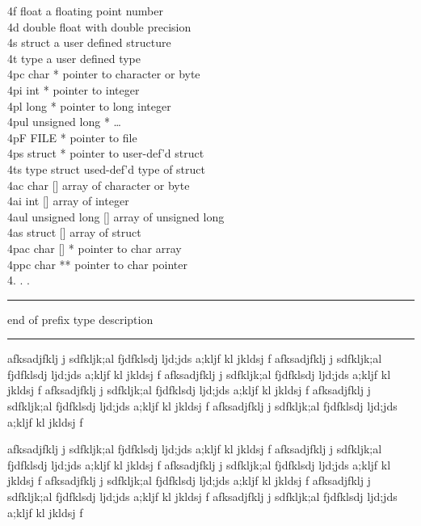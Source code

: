 \documentclass[12pt]{article}
\begin{document}
\begin{mylist}
4f        float                   a floating point number\\
4d        double          float with double precision\\
4s        struct          a user defined structure\\
4t        type                    a user defined type\\
4pc       char *          pointer to character or byte\\
4pi       int *                   pointer to integer\\
4pl       long *          pointer to long integer\\
4pul      unsigned long *         \dots\\
4pF       FILE *          pointer to file\\
4ps       struct *                pointer to user-def'd struct\\
4ts       type struct             used-def'd type of struct\\
4ac       char []                 array of character or byte\\
4ai       int []          array of integer\\
4aul      unsigned long []        array of unsigned long\\
4as       struct []               array of struct\\
4pac      char [] *               pointer to char array\\
4ppc      char **                 pointer to char pointer\\
4.          .                     . \\ \hrule
end of prefix  type  description \\     \hrule
\end{mylist}





{\raggedleft
afksadjfklj j sdfkljk;al fjdfklsdj ljd;jds a;kljf kl jkldsj f
afksadjfklj j sdfkljk;al fjdfklsdj ljd;jds a;kljf kl jkldsj f
afksadjfklj j sdfkljk;al fjdfklsdj ljd;jds a;kljf kl jkldsj f
afksadjfklj j sdfkljk;al fjdfklsdj ljd;jds a;kljf kl jkldsj f
afksadjfklj j sdfkljk;al fjdfklsdj ljd;jds a;kljf kl jkldsj f
afksadjfklj j sdfkljk;al fjdfklsdj ljd;jds a;kljf kl jkldsj f}
{\raggedright
afksadjfklj j sdfkljk;al fjdfklsdj ljd;jds a;kljf kl jkldsj f
afksadjfklj j sdfkljk;al fjdfklsdj ljd;jds a;kljf kl jkldsj f
afksadjfklj j sdfkljk;al fjdfklsdj ljd;jds a;kljf kl jkldsj f
afksadjfklj j sdfkljk;al fjdfklsdj ljd;jds a;kljf kl jkldsj f
afksadjfklj j sdfkljk;al fjdfklsdj ljd;jds a;kljf kl jkldsj f
afksadjfklj j sdfkljk;al fjdfklsdj ljd;jds a;kljf kl jkldsj f}
\end{document}
